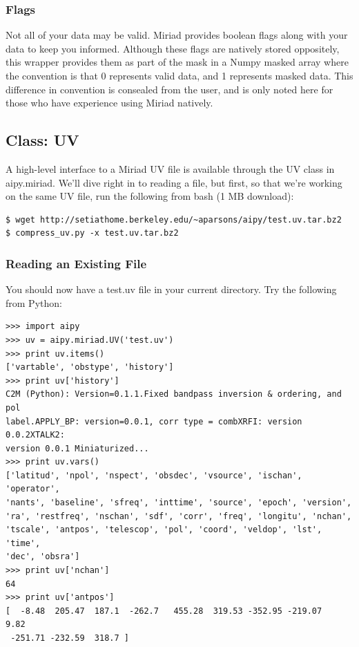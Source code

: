 \subsubsection{Flags}
Not all of your data may be valid.  Miriad provides boolean flags along with 
your data to keep you informed.  Although these flags are natively stored
oppositely, this wrapper provides them as part of the mask in a Numpy masked
array where the convention is that 0 represents valid data, and 1 represents
masked data.  This difference in convention is consealed from the user,
and is only noted here for those who have experience using Miriad natively.

\subsection{Class: UV}

A high-level interface to a Miriad UV file is available through the 
UV class in aipy.miriad.  We'll dive right in to reading a file, but first,
so that we're working on the same UV file, run the following from bash (1 MB
download):

\begin{verbatim}
$ wget http://setiathome.berkeley.edu/~aparsons/aipy/test.uv.tar.bz2
$ compress_uv.py -x test.uv.tar.bz2
\end{verbatim}

\subsubsection{Reading an Existing File}

You should now have a test.uv file in your current directory.  Try the
following from Python:

\begin{verbatim}
>>> import aipy
>>> uv = aipy.miriad.UV('test.uv')
>>> print uv.items()
['vartable', 'obstype', 'history']
>>> print uv['history']
C2M (Python): Version=0.1.1.Fixed bandpass inversion & ordering, and pol 
label.APPLY_BP: version=0.0.1, corr type = combXRFI: version 0.0.2XTALK2: 
version 0.0.1 Miniaturized...
>>> print uv.vars()
['latitud', 'npol', 'nspect', 'obsdec', 'vsource', 'ischan', 'operator', 
'nants', 'baseline', 'sfreq', 'inttime', 'source', 'epoch', 'version', 
'ra', 'restfreq', 'nschan', 'sdf', 'corr', 'freq', 'longitu', 'nchan', 
'tscale', 'antpos', 'telescop', 'pol', 'coord', 'veldop', 'lst', 'time', 
'dec', 'obsra']
>>> print uv['nchan']
64
>>> print uv['antpos']
[  -8.48  205.47  187.1  -262.7   455.28  319.53 -352.95 -219.07    9.82
 -251.71 -232.59  318.7 ]
\end{verbatim}

